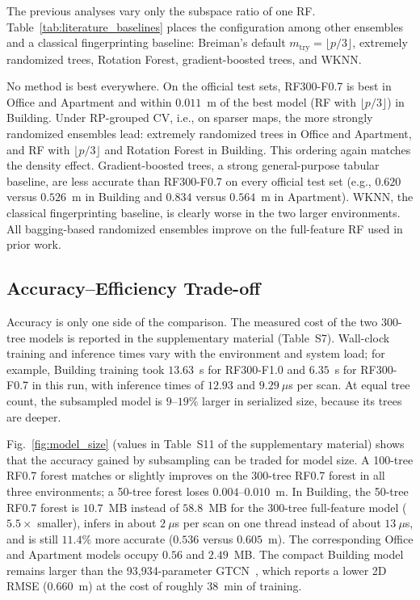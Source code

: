 The previous analyses vary only the subspace ratio of one RF. Table~\ref{tab:literature_baselines} places the configuration among other ensembles and a classical fingerprinting baseline: Breiman's default $m_{\mathrm{try}}=\lfloor p/3\rfloor$, extremely randomized trees, Rotation Forest, gradient-boosted trees, and WKNN.



No method is best everywhere. On the official test sets, RF300-F0.7 is best in Office and Apartment and within $0.011$~m of the best model (RF with $\lfloor p/3\rfloor$) in Building. Under RP-grouped CV, i.e., on sparser maps, the more strongly randomized ensembles lead: extremely randomized trees in Office and Apartment, and RF with $\lfloor p/3\rfloor$ and Rotation Forest in Building. This ordering again matches the density effect. Gradient-boosted trees, a strong general-purpose tabular baseline, are less accurate than RF300-F0.7 on every official test set (e.g., $0.620$ versus $0.526$~m in Building and $0.834$ versus $0.564$~m in Apartment). WKNN, the classical fingerprinting baseline, is clearly worse in the two larger environments. All bagging-based randomized ensembles improve on the full-feature RF used in prior work.

\subsection{Accuracy--Efficiency Trade-off}
\label{subsec:efficiency_results}

Accuracy is only one side of the comparison. The measured cost of the two 300-tree models is reported in the supplementary material (Table~S7). Wall-clock training and inference times vary with the environment and system load; for example, Building training took $13.63$~s for RF300-F1.0 and $6.35$~s for RF300-F0.7 in this run, with inference times of $12.93$ and $9.29~\mu$s per scan. At equal tree count, the subsampled model is $9$--$19\%$ larger in serialized size, because its trees are deeper.

Fig.~\ref{fig:model_size} (values in Table~S11 of the supplementary material) shows that the accuracy gained by subsampling can be traded for model size. A 100-tree RF0.7 forest matches or slightly improves on the 300-tree RF0.7 forest in all three environments; a 50-tree forest loses $0.004$--$0.010$~m. In Building, the 50-tree RF0.7 forest is $10.7$~MB instead of $58.8$~MB for the 300-tree full-feature model ($5.5\times$ smaller), infers in about $2~\mu$s per scan on one thread instead of about $13~\mu$s, and is still $11.4\%$ more accurate ($0.536$ versus $0.605$~m). The corresponding Office and Apartment models occupy $0.56$ and $2.49$~MB. The compact Building model remains larger than the 93,934-parameter GTCN~\cite{rana2025gtcn}, which reports a lower 2D RMSE ($0.660$~m) at the cost of roughly 38~min of training.

